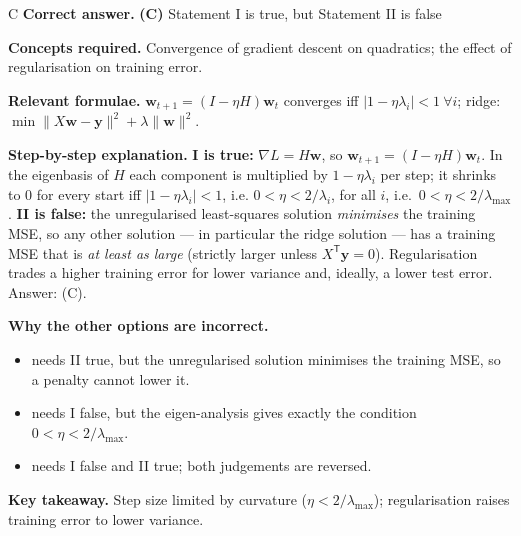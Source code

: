 \documentclass[11pt,a4paper]{article}
\newcommand{\qsep}{\par\vspace{2pt}{\color{black!15}\hrule}\vspace{4pt}}
\begin{document}
\begin{solbox}{C}
\textbf{\color{brand}Correct answer.} \textcolor{okgreen}{\textbf{(C)}} Statement I is true, but Statement II is false

\textbf{\color{brand}Concepts required.} Convergence of gradient descent on quadratics; the effect of regularisation on training error.

\textbf{\color{brand}Relevant formulae.} $\mathbf w_{t+1} = (I - \eta H)\mathbf w_t$ converges iff $|1 - \eta\lambda_i| < 1\ \forall i$; ridge: $\min\|X\mathbf w - \mathbf y\|^2 + \lambda\|\mathbf w\|^2$.

\textbf{\color{brand}Step-by-step explanation.} \textbf{I is true:} $\nabla L = H\mathbf w$, so $\mathbf w_{t+1} = (I - \eta H)\mathbf w_t$. In the eigenbasis of $H$ each
component is multiplied by $1 - \eta\lambda_i$ per step; it shrinks to 0 for every start iff $|1 - \eta\lambda_i| < 1$, i.e.
$0 < \eta < 2/\lambda_i$, for all $i$, i.e.\ $0 < \eta < 2/\lambda_{\max}$.
\textbf{II is false:} the unregularised least-squares solution \emph{minimises} the training MSE, so any other solution ---
in particular the ridge solution --- has a training MSE that is \emph{at least as large} (strictly larger unless
$X^{\mathsf T}\mathbf y = 0$). Regularisation trades a higher training error for lower variance and, ideally, a lower test error. Answer: (C).

\textbf{\color{brand}Why the other options are incorrect.}
\begin{itemize}[leftmargin=2.4em, itemsep=1pt, topsep=2pt]
\item[\textbf{(A)}] needs II true, but the unregularised solution minimises the training MSE, so a penalty cannot lower it.
\item[\textbf{(B)}] needs I false, but the eigen-analysis gives exactly the condition $0 < \eta < 2/\lambda_{\max}$.
\item[\textbf{(D)}] needs I false and II true; both judgements are reversed.
\end{itemize}
\textbf{\color{brand}Key takeaway.} Step size limited by curvature ($\eta < 2/\lambda_{\max}$); regularisation raises training error to lower variance.
\end{solbox}
\qsep
\end{document}
